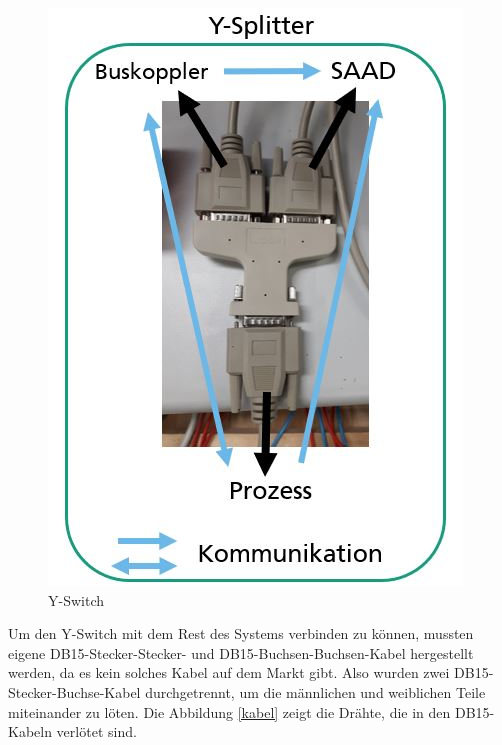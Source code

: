 \documentclass[12pt,a4paper]{scrartcl}
\numberwithin{equation}{section}
\begin{document}
\begin{figure}[ht!]
	\centering
	  \includegraphics[scale=0.45]{y-switch.jpg}
	  \caption{Y-Switch}
	\label{yswitch}
\end{figure}

Um den Y-Switch mit dem Rest des Systems verbinden zu können, mussten eigene DB15-Stecker-Stecker- und DB15-Buchsen-Buchsen-Kabel hergestellt werden, da es kein solches Kabel auf dem Markt gibt. Also wurden zwei DB15-Stecker-Buchse-Kabel durchgetrennt, um die männlichen und weiblichen Teile miteinander zu löten. Die Abbildung \ref{kabel} zeigt die Drähte, die in den DB15-Kabeln verlötet sind. 
\end{document}

